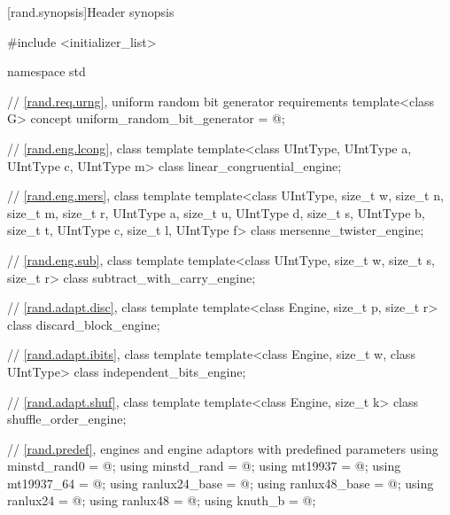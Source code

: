 

[rand.synopsis]{Header  synopsis}


\begin{codeblock}
#include <initializer_list>

namespace std {
  // \ref{rand.req.urng}, uniform random bit generator requirements
  template<class G>
    concept uniform_random_bit_generator = @\seebelow@;

  // \ref{rand.eng.lcong}, class template 
  template<class UIntType, UIntType a, UIntType c, UIntType m>
    class linear_congruential_engine;

  // \ref{rand.eng.mers}, class template 
  template<class UIntType, size_t w, size_t n, size_t m, size_t r,
           UIntType a, size_t u, UIntType d, size_t s,
           UIntType b, size_t t,
           UIntType c, size_t l, UIntType f>
    class mersenne_twister_engine;

  // \ref{rand.eng.sub}, class template 
  template<class UIntType, size_t w, size_t s, size_t r>
    class subtract_with_carry_engine;

  // \ref{rand.adapt.disc}, class template 
  template<class Engine, size_t p, size_t r>
    class discard_block_engine;

  // \ref{rand.adapt.ibits}, class template 
  template<class Engine, size_t w, class UIntType>
    class independent_bits_engine;

  // \ref{rand.adapt.shuf}, class template 
  template<class Engine, size_t k>
    class shuffle_order_engine;

  // \ref{rand.predef}, engines and engine adaptors with predefined parameters
  using minstd_rand0  = @\seebelow@;
  using minstd_rand   = @\seebelow@;
  using mt19937       = @\seebelow@;
  using mt19937_64    = @\seebelow@;
  using ranlux24_base = @\seebelow@;
  using ranlux48_base = @\seebelow@;
  using ranlux24      = @\seebelow@;
  using ranlux48      = @\seebelow@;
  using knuth_b       = @\seebelow@;

}
\end{codeblock}

